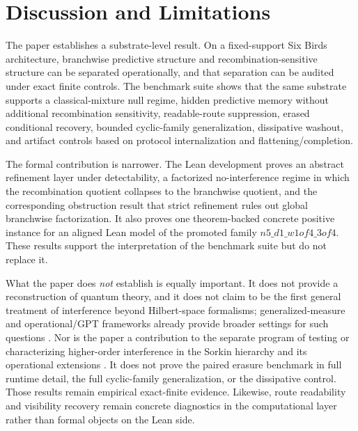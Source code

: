 \documentclass[11pt]{article}
\theoremstyle{definition}
\begin{document}
\section{Discussion and Limitations}

The paper establishes a substrate-level result. On a fixed-support Six Birds architecture, branchwise predictive structure and recombination-sensitive structure can be separated operationally, and that separation can be audited under exact finite controls. The benchmark suite shows that the same substrate supports a classical-mixture null regime, hidden predictive memory without additional recombination sensitivity, readable-route suppression, erased conditional recovery, bounded cyclic-family generalization, dissipative washout, and artifact controls based on protocol internalization and flattening/completion.

The formal contribution is narrower. The Lean development proves an abstract refinement layer under detectability, a factorized no-interference regime in which the recombination quotient collapses to the branchwise quotient, and the corresponding obstruction result that strict refinement rules out global branchwise factorization. It also proves one theorem-backed concrete positive instance for an aligned Lean model of the promoted family \(n5\_d1\_w1of4\_3of4\). These results support the interpretation of the benchmark suite but do not replace it.

What the paper does \emph{not} establish is equally important. It does not provide a reconstruction of quantum theory, and it does not claim to be the first general treatment of interference beyond Hilbert-space formalisms; generalized-measure and operational/GPT frameworks already provide broader settings for such questions \cite{Sorkin1994QuantumMeasure,Barrett2007GPT,BarnumMuellerUdudec2014HigherOrder,LeeSelby2017HigherOrder,DakicPaterekBrukner2014DensityCubes,GarnerEtAl2013PhaseInterference,Plavala2023GPTIntro,ChiribellaDarianoPerinotti2011InformationalDerivation}. Nor is the paper a contribution to the separate program of testing or characterizing higher-order interference in the Sorkin hierarchy and its operational extensions \cite{SinhaEtAl2010RulingOutMultiOrder,UdudecBarnumEmerson2011ThreeSlit,DakicPaterekBrukner2014DensityCubes,LeeSelby2017HigherOrder}. It does not prove the paired erasure benchmark in full runtime detail, the full cyclic-family generalization, or the dissipative control. Those results remain empirical exact-finite evidence. Likewise, route readability and visibility recovery remain concrete diagnostics in the computational layer rather than formal objects on the Lean side.
\end{document}
